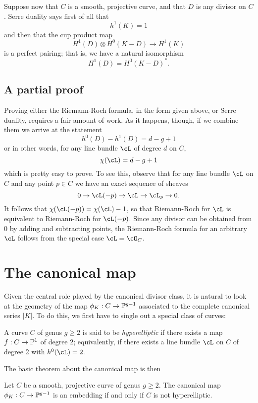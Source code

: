 Suppose now that $C$ is a smooth, projective curve, and that $D$ is any divisor on $C$. Serre duality says first of all that
$$
h^1(K) = 1
$$
and then that the cup product map
$$
H^1(D) \otimes H^0(K-D) \to H^1(K)
$$
is a perfect pairing; that is, we have a natural isomorphism
$$
H^1(D) = H^0(K-D)^*.
$$

\subsection{A partial proof}

Proving either the Riemann-Roch formula, in the form given above, or Serre duality, requires a fair amount of work. As it happens, though, if we combine them we arrive at the statement
$$
h^0(D) - h^1(D) = d-g+1
$$
or in other words, for any line bundle $\cL$ of degree $d$ on $C$,
$$
\chi(\cL) = d-g+1
$$
which is pretty easy to prove. To see this, observe that for any line bundle $\cL$ on $C$ and any point $p \in C$ we have an exact sequence of sheaves
$$
0 \to \cL(-p) \to \cL \to \cL_p \to 0.
$$
It follows that $\chi(\cL(-p)) = \chi(\cL) - 1$, so that Riemann-Roch for $\cL$ is equivalent to Riemann-Roch for $\cL(-p)$. Since any divisor can be obtained from 0 by adding and subtracting points, the Riemann-Roch formula for an arbitrary $\cL$ follows from the special case $\cL = \cO_C$.


\section{The canonical map}

Given the central role played by the canonical divisor class, it is natural to look at the geometry of the map $\phi_K : C \to \PP^{g-1}$ associated to the complete canonical series $|K|$. To do this, we first have to single out a special class of curves:

\begin{definition}
A curve $C$ of genus $g \geq 2$ is said to be \emph{hyperelliptic} if there exists a map $f : C \to \PP^1$ of degree 2; equivalently, if there exists a line bundle $\cL$ on $C$ of degree 2 with $h^0(\cL) = 2$.
\end{definition}

The basic theorem about the canonical map is then

\begin{proposition}
Let $C$ be a smooth, projective curve of genus $g\geq 2$. The canonical map $\phi_K : C \to \PP^{g-1}$ is an embedding if and only if $C$ is not hyperelliptic.
\end{proposition}

